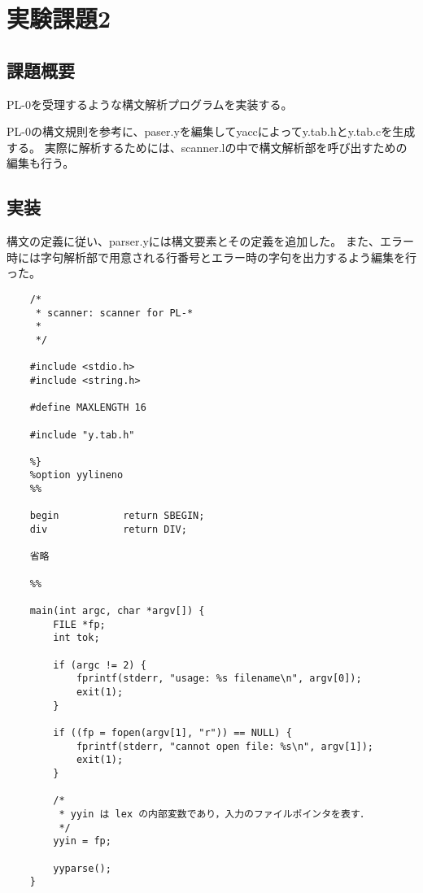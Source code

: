 \section{実験課題2}
\subsection{課題概要}
PL-0を受理するような構文解析プログラムを実装する。

PL-0の構文規則を参考に、paser.yを編集してyaccによってy.tab.hとy.tab.cを生成する。
実際に解析するためには、scanner.lの中で構文解析部を呼び出すための編集も行う。

\subsection{実装}
構文の定義に従い、parser.yには構文要素とその定義を追加した。
また、エラー時には字句解析部で用意される行番号とエラー時の字句を出力するよう編集を行った。



\begin{lstlisting}[caption={scanner.l},label={scanner.l2}]
  %{
    /* 
     * scanner: scanner for PL-*
     * 
     */
    
    #include <stdio.h>
    #include <string.h>
    
    #define MAXLENGTH 16
    
    #include "y.tab.h"
    
    %}
    %option yylineno
    %%
    
    begin           return SBEGIN;
    div             return DIV;
    
    省略

    %%
    
    main(int argc, char *argv[]) {
        FILE *fp;
        int tok;
        
        if (argc != 2) {
            fprintf(stderr, "usage: %s filename\n", argv[0]);
            exit(1);
        }
    
        if ((fp = fopen(argv[1], "r")) == NULL) {
            fprintf(stderr, "cannot open file: %s\n", argv[1]);
            exit(1);
        }
    
        /*
         * yyin は lex の内部変数であり，入力のファイルポインタを表す．
         */
        yyin = fp;
    
        yyparse();
    }
    
\end{lstlisting}

